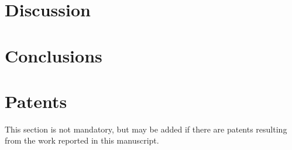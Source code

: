 \documentclass[journal,article,submit,pdftex,moreauthors]{Definitions/mdpi}
\begin{document}




\section{Discussion}



\section{Conclusions}



\section{Patents}

This section is not mandatory, but may be added if there are patents resulting from the work reported in this manuscript.
\end{document}
